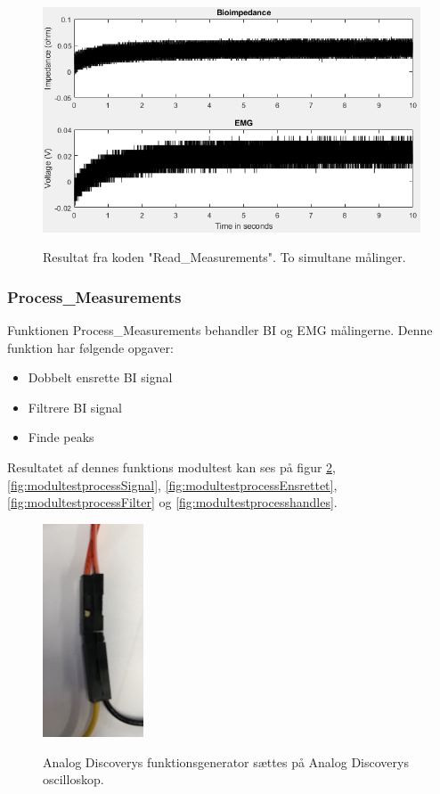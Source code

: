 \begin{figure}[H] 
\centering
{\includegraphics[width=\linewidth]
{Figure/modultestread}}
\caption{Resultat fra koden "Read\_Measurements". To simultane målinger.}
\label{fig:modultestread}
\end{figure}




\subsubsection{Process\_Measurements} 

Funktionen Process\_Measurements behandler BI og EMG målingerne. Denne funktion har følgende opgaver:
\begin{itemize}
\item Dobbelt ensrette BI signal
\item Filtrere BI signal
\item Finde peaks
\end{itemize}

Resultatet af dennes funktions modultest kan ses på figur \ref{fig:modultestsinus2}, \ref{fig:modultestprocessSignal}, \ref{fig:modultestprocessEnsrettet}, \ref{fig:modultestprocessFilter} og \ref{fig:modultestprocesshandles}.


\begin{figure}[H] 
\centering
{\includegraphics[width=3cm]
{Figure/modultestsinus2}}
\caption{Analog Discoverys funktionsgenerator sættes på Analog Discoverys oscilloskop.}
\label{fig:modultestsinus2}
\end{figure}

